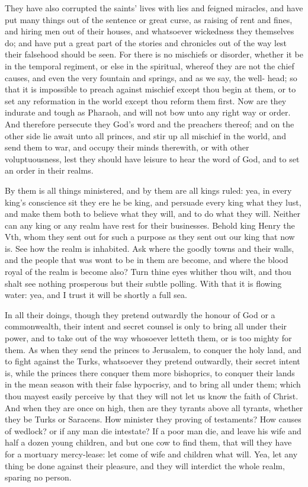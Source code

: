 They have also corrupted the saints' lives with lies and 
feigned miracles, and have put many things out of the 
sentence or great curse, as raising of rent and fines, and 
hiring men out of their houses, and whatsoever wickedness
they themselves do; and have put a great part of the 
stories and chronicles out of the way lest their falsehood 
should be seen. For there is no mischiefs or disorder, 
whether it be in the temporal regiment, or else in the 
spiritual, whereof they are not the chief causes, and even 
the very fountain and springs, and as we say, the well- 
head; so that it is impossible to preach against mischief 
except thou begin at them, or to set any reformation in 
the world except thou reform them first. Now are they 
indurate and tough as Pharaoh, and will not bow unto 
any right way or order. And therefore persecute they 
God's word and the preachers thereof; and on the other 
side lie await unto all princes, and stir up all mischief in 
the world, and send them to war, and occupy their minds 
therewith, or with other voluptuousness, lest they should 
have leisure to hear the word of God, and to set an order 
in their realms. 

By them is all things ministered, and by them are all 
kings ruled: yea, in every king's conscience sit they ere 
he be king, and persuade every king what they lust, and 
make them both to believe what they will, and to do what 
they will. Neither can any king or any realm have rest for 
their businesses. Behold king Henry the Vth, whom they 
sent out for such a purpose as they sent out our king that 
now is. See how the realm is inhabited. Ask where the 
goodly towns and their walls, and the people that was 
wont to be in them are become, and where the blood 
royal of the realm is become also? Turn thine eyes 
whither thou wilt, and thou shalt see nothing prosperous 
but their subtle polling. With that it is flowing water: 
yea, and I trust it will be shortly a full sea. 

In all their doings, though they pretend outwardly the 
honour of God or a commonwealth, their intent and 
secret counsel is only to bring all under their power, and 
to take out of the way whosoever letteth them, or is too 
mighty for them. As when they send the princes to 
Jerusalem, to conquer the holy land, and to fight against 
the Turks, whatsoever they pretend outwardly, their 
secret intent is, while the princes there conquer them more 
bishoprics, to conquer their lands in the mean season with 
their false hypocrisy, and to bring all under them; which 
thou mayest easily perceive by that they will not let us 
know the faith of Christ. And when they are once on 
high, then are they tyrants above all tyrants, whether they 
be Turks or Saracens. How minister they proving of 
testaments? How causes of wedlock? or if any man 
die intestate? If a poor man die, and leave his wife 
and half a dozen young children, and but one cow to find 
them, that will they have for a mortuary mercy-lease: let 
come of wife and children what will. Yea, let any thing 
be done against their pleasure, and they will interdict the 
whole realm, sparing no person. 

